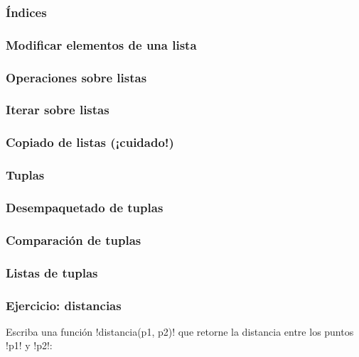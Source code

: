 \documentclass[12pt]{beamer}
\begin{document}
  \begin{frame}
    \label{listas-indices}
    \frametitle{Índices}
    
  \end{frame}

  \begin{frame}
    \label{listas-modificar}
    \frametitle{Modificar elementos de una lista}
    
  \end{frame}

  \begin{frame}
    \label{listas-operaciones}
    \frametitle{Operaciones sobre listas}
    
  \end{frame}

  \begin{frame}
    \label{listas-iterar}
    \frametitle{Iterar sobre listas}
    
  \end{frame}

  \begin{frame}
    \label{listas-copiar}
    \frametitle{Copiado de listas (¡cuidado!)}
    
  \end{frame}

  \begin{frame}
    \label{tuplas}
    \frametitle{Tuplas}
    
  \end{frame}

  \begin{frame}
    \label{tuplas-desempaquetar}
    \frametitle{Desempaquetado de tuplas}
    
  \end{frame}

  \begin{frame}
    \label{tuplas-comparar}
    \frametitle{Comparación de tuplas}
    
  \end{frame}

  \begin{frame}
    \label{listas-de-tuplas}
    \frametitle{Listas de tuplas}
    
  \end{frame}

  \begin{frame}
    \label{ejercicio-distancia}
    \frametitle{Ejercicio: distancias}
    Escriba una función \li!distancia(p1, p2)!
    que retorne la distancia entre los puntos \li!p1! y \li!p2!:
    
  \end{frame}
\end{document}
